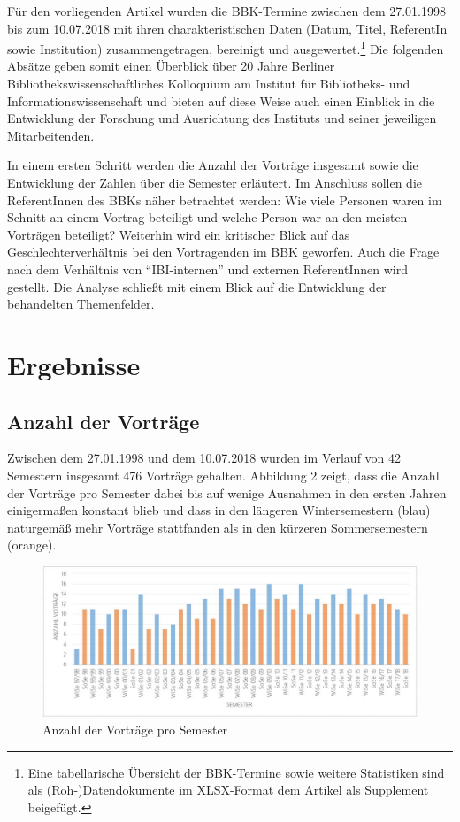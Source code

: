 \documentclass[a4paper,
fontsize=11pt,
oneside,
numbers=noperiodatend,
parskip=half-,
bibliography=totoc,
final
]{scrartcl}
\begin{document}
Für den vorliegenden Artikel wurden die BBK-Termine zwischen dem
27.01.1998 bis zum 10.07.2018 mit ihren charakteristischen Daten (Datum,
Titel, ReferentIn sowie Institution) zusammengetragen, bereinigt und
ausgewertet.\footnote{Eine tabellarische Übersicht der BBK-Termine sowie
  weitere Statistiken sind als (Roh-)Datendokumente im XLSX-Format dem
  Artikel als Supplement beigefügt.} Die folgenden Absätze geben somit
einen Überblick über 20 Jahre Berliner Bibliothekswissenschaftliches
Kolloquium am Institut für Bibliotheks- und Informationswissenschaft und
bieten auf diese Weise auch einen Einblick in die Entwicklung der
Forschung und Ausrichtung des Instituts und seiner jeweiligen
Mitarbeitenden.

In einem ersten Schritt werden die Anzahl der Vorträge insgesamt sowie
die Entwicklung der Zahlen über die Semester erläutert. Im Anschluss
sollen die ReferentInnen des BBKs näher betrachtet werden: Wie viele
Personen waren im Schnitt an einem Vortrag beteiligt und welche Person
war an den meisten Vorträgen beteiligt? Weiterhin wird ein kritischer
Blick auf das Geschlechterverhältnis bei den Vortragenden im BBK
geworfen. Auch die Frage nach dem Verhältnis von \enquote{IBI-internen}
und externen ReferentInnen wird gestellt. Die Analyse schließt mit einem
Blick auf die Entwicklung der behandelten Themenfelder.

\hypertarget{ergebnisse}{%
\section{Ergebnisse}\label{ergebnisse}}

\hypertarget{anzahl-der-vortruxe4ge}{%
\subsection{Anzahl der Vorträge}\label{anzahl-der-vortruxe4ge}}

Zwischen dem 27.01.1998 und dem 10.07.2018 wurden im Verlauf von 42
Semestern insgesamt 476 Vorträge gehalten. Abbildung 2 zeigt, dass die
Anzahl der Vorträge pro Semester dabei bis auf wenige Ausnahmen in den
ersten Jahren einigermaßen konstant blieb und dass in den längeren
Wintersemestern (blau) naturgemäß mehr Vorträge stattfanden als in den
kürzeren Sommersemestern (orange).

\begin{figure}[h!]
\centering
\includegraphics[width=15cm]{img/Abbildung2.JPG}
\caption{Anzahl der Vorträge pro Semester}
\end{figure}
\end{document}

